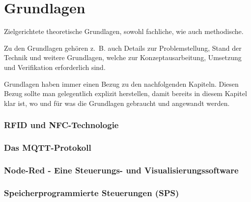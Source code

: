 \chapter{Grundlagen}
\label{cha:Grundlagen}

Zielgerichtete theoretische Grundlagen, sowohl fachliche, wie auch methodische.

Zu den Grundlagen gehören z.~B. auch Details zur Problemstellung, Stand der Technik und weitere Grundlagen, welche zur Konzeptausarbeitung, Umsetzung und Verifikation erforderlich sind.

Grundlagen haben immer einen Bezug zu den nachfolgenden Kapiteln. Diesen Bezug sollte man gelegentlich explizit herstellen, damit bereits in diesem Kapitel klar ist, wo und für was die Grundlagen gebraucht und angewandt werden.

\subsection{RFID und NFC-Technologie}

\subsection{Das MQTT-Protokoll}

\subsection{Node-Red - Eine Steuerungs- und Visualisierungssoftware}

\subsection{Speicherprogrammierte Steuerungen (SPS)}
